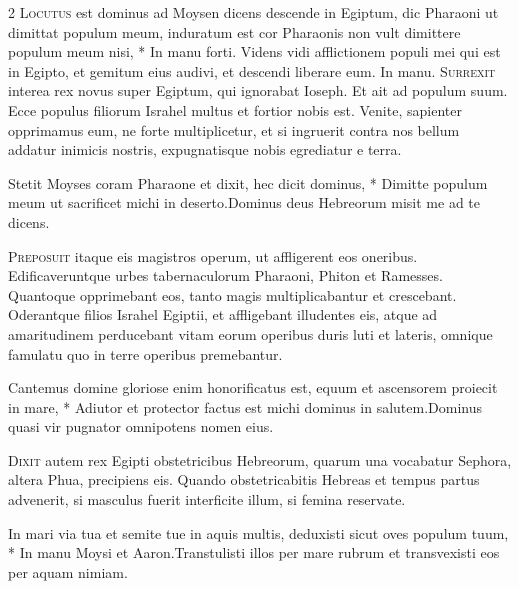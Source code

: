 \begin{multicols*}{2}
\lettrine[lines=2]{\zallmancaps \color{Blue} L}{ocutus} \hypertarget{locutus-est-quarta-quadragesima}{\label{locutus-est-quarta-quadragesima}} est dominus ad Moysen dicens descende in Egiptum, dic Pharaoni ut dimittat populum meum, induratum est cor Pharaonis non vult dimittere populum meum nisi, * In manu forti. \V Videns vidi afflictionem populi mei qui est in Egipto, et gemitum eius audivi, et descendi liberare eum. In manu.
\lettrine[lines=2]{\zallmancaps \color{Red} S}{urrexit} interea rex novus super Egiptum, qui ignorabat Ioseph. Et ait ad populum suum. Ecce populus filiorum Israhel multus et fortior nobis est. Venite, sapienter opprimamus eum, ne forte multiplicetur, et si ingruerit contra nos bellum addatur inimicis nostris, expugnatisque nobis egrediatur e terra.
\begin{responsory}
{Stetit Moyses coram Pharaone et dixit, hec dicit dominus, * Dimitte populum meum ut sacrificet michi in deserto.}{Dominus deus Hebreorum misit me ad te dicens.}
\end{responsory}%
\lettrine[lines=2]{\zallmancaps \color{Blue} P}{reposuit} itaque eis magistros operum, ut affligerent eos oneribus. Edificaveruntque urbes tabernaculorum Pharaoni, Phiton et Ramesses. Quantoque opprimebant eos, tanto magis multiplicabantur et crescebant. Oderantque filios Israhel Egiptii, et affligebant illudentes eis, atque ad amaritudinem perducebant vitam eorum operibus duris luti et lateris, omnique famulatu quo in terre operibus premebantur.
\begin{responsory-doxology}
{Cantemus domine gloriose enim honorificatus est, equum et ascensorem proiecit in mare, * Adiutor et protector factus est michi dominus in salutem.}{Dominus quasi vir pugnator omnipotens nomen eius.}
\end{responsory-doxology}%
\lettrine[lines=2]{\zallmancaps \color{Red} D}{ixit} autem rex Egipti obstetricibus Hebreorum, quarum una vocabatur Sephora, altera Phua, precipiens eis. Quando obstetricabitis Hebreas et tempus partus advenerit, si masculus fuerit interficite illum, si femina reservate.
\begin{responsory}
{In mari via tua et semite tue in aquis multis, deduxisti sicut oves populum tuum, * In manu Moysi et Aaron.}{Transtulisti illos per mare rubrum et transvexisti eos per aquam nimiam.}

\end{responsory}
\end{multicols*}
